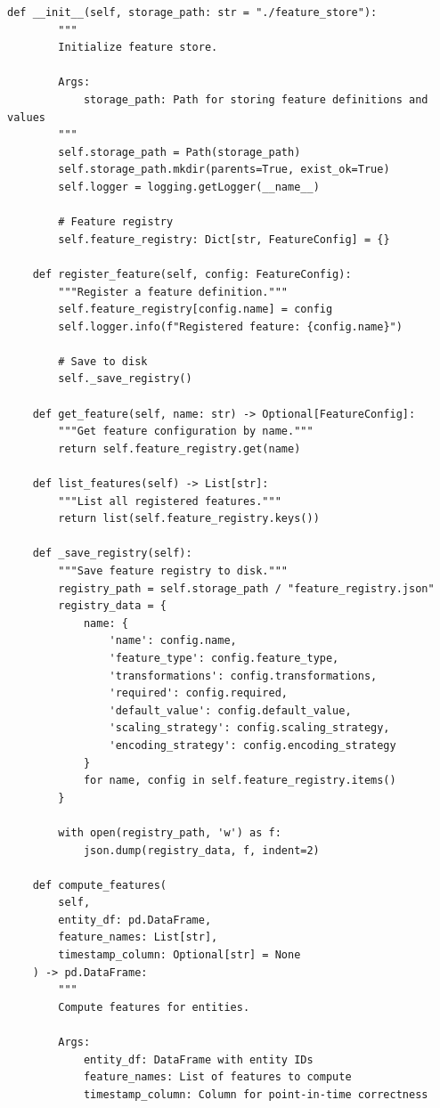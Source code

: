 \begin{lstlisting}[style=python, caption={Production Feature Engineering Framework}]
    def __init__(self, storage_path: str = "./feature_store"):
        """
        Initialize feature store.

        Args:
            storage_path: Path for storing feature definitions and values
        """
        self.storage_path = Path(storage_path)
        self.storage_path.mkdir(parents=True, exist_ok=True)
        self.logger = logging.getLogger(__name__)

        # Feature registry
        self.feature_registry: Dict[str, FeatureConfig] = {}

    def register_feature(self, config: FeatureConfig):
        """Register a feature definition."""
        self.feature_registry[config.name] = config
        self.logger.info(f"Registered feature: {config.name}")

        # Save to disk
        self._save_registry()

    def get_feature(self, name: str) -> Optional[FeatureConfig]:
        """Get feature configuration by name."""
        return self.feature_registry.get(name)

    def list_features(self) -> List[str]:
        """List all registered features."""
        return list(self.feature_registry.keys())

    def _save_registry(self):
        """Save feature registry to disk."""
        registry_path = self.storage_path / "feature_registry.json"
        registry_data = {
            name: {
                'name': config.name,
                'feature_type': config.feature_type,
                'transformations': config.transformations,
                'required': config.required,
                'default_value': config.default_value,
                'scaling_strategy': config.scaling_strategy,
                'encoding_strategy': config.encoding_strategy
            }
            for name, config in self.feature_registry.items()
        }

        with open(registry_path, 'w') as f:
            json.dump(registry_data, f, indent=2)

    def compute_features(
        self,
        entity_df: pd.DataFrame,
        feature_names: List[str],
        timestamp_column: Optional[str] = None
    ) -> pd.DataFrame:
        """
        Compute features for entities.

        Args:
            entity_df: DataFrame with entity IDs
            feature_names: List of features to compute
            timestamp_column: Column for point-in-time correctness


\end{lstlisting}
